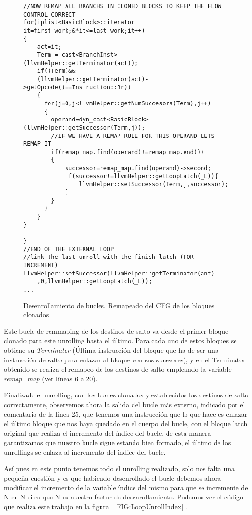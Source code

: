 \begin{figure}[tph]
\begin{lstlisting}
//NOW REMAP ALL BRANCHS IN CLONED BLOCKS TO KEEP THE FLOW CONTROL CORRECT
for(iplist<BasicBlock>::iterator it=first_work;&*it<=last_work;it++)
{
	act=it;
	Term = cast<BranchInst>(llvmHelper::getTerminator(act));
	if((Term)&&
	(llvmHelper::getTerminator(act)->getOpcode()==Instruction::Br))
	{
	  for(j=0;j<llvmHelper::getNumSuccesors(Term);j++)
	  {
	    operand=dyn_cast<BasicBlock>(llvmHelper::getSuccessor(Term,j));
		//IF WE HAVE A REMAP RULE FOR THIS OPERAND LETS REMAP IT
	  	if(remap_map.find(operand)!=remap_map.end())
		{
			successor=remap_map.find(operand)->second;
			if(successor!=llvmHelper::getLoopLatch(_L)){
				llvmHelper::setSuccessor(Term,j,successor);
			}
		}
	  }
	}
}

}
//END OF THE EXTERNAL LOOP
//link the last unroll with the finish latch (FOR INCREMENT)
llvmHelper::setSuccessor(llvmHelper::getTerminator(ant)
	,0,llvmHelper::getLoopLatch(_L));
...
\end{lstlisting}
\caption{Desenrollamiento de bucles, Remapeado del CFG de los bloques clonados}
\label{FIG:LoopUnrollRemap}
\end{figure}

Este bucle de remmaping de los destinos de salto va desde el primer bloque clonado para este unrolling hasta el último. Para cada uno de estos bloques se obtiene su \textit{Terminator} (Última instrucción del bloque que ha de ser una instrucción de salto para enlazar al bloque con sus sucesores), y en el Terminator obtenido se realiza el remapeo de los destinos de salto empleando la variable \textit{remap\_map} (ver líneas 6 a 20).

Finalizado el unrolling, con los bucles clonados y establecidos los destinos de salto correctamente, observemos ahora la salida del bucle más externo, indicado por el comentario de la linea 25, que tenemos una instrucción que lo que hace es enlazar el último bloque que nos haya quedado en el cuerpo del bucle, con el bloque latch original que realiza el incremento del índice del bucle, de esta manera garantizamos que nuestro bucle sigue estando bien formado, el último de los unrollings se enlaza al incremento del índice del bucle.

Así pues en este punto tenemos todo el unrolling realizado, solo nos falta una pequeña cuestión y es que habiendo desenrollado el bucle debemos ahora modificar el incremento de la variable índice del mismo para que se incremente de N en N si es que N es nuestro factor de desenrollamiento. Podemos ver el código que realiza este trabajo en la figura ~\ref{FIG:LoopUnrollIndex} .

